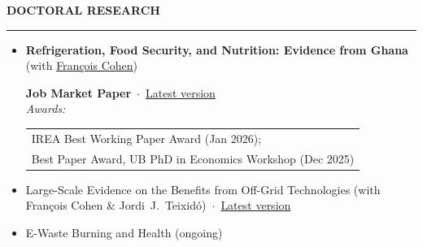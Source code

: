 \documentclass{resume} %
\def\sectionskip{\vspace{4pt}}
\def\sectionlineskip{\smallskip}
\renewenvironment{rSection}[1]{%
  \sectionskip
  \MakeUppercase{{\bf #1}}%
  \sectionlineskip
  \hrule
  \begin{list}{}{\setlength{\leftmargin}{0em}\setlength{\topsep}{5pt}\setlength{\itemsep}{0pt}\setlength{\parsep}{0pt}}%
  \item[]
}{%
  \end{list}
}
\begin{document}
\begin{rSection}{Doctoral Research}
\raggedright
\begin{itemize}
\item \textbf{Refrigeration, Food Security, and Nutrition: Evidence from Ghana} (with \href{https://sites.google.com/site/francoiscoheneconomist/home}{François Cohen})\\
{\small \textbf{Job Market Paper} \,$\cdot$\, \href{https://ntsifulenoch.github.io/files/Ntsiful_JMP.pdf}{Latest version}\\
\textit{Awards:} \begin{tabular}[t]{@{}l@{}}IREA Best Working Paper Award (Jan 2026);\\ Best Paper Award, UB PhD in Economics Workshop (Dec 2025)\end{tabular}}
\item Large-Scale Evidence on the Benefits from Off-Grid Technologies (with François Cohen \& Jordi~J.~Teixidó) \,$\cdot$\, {\small \href{https://ntsifulenoch.github.io/files/Ntsiful_Offgrid.pdf}{Latest version}}
\item E-Waste Burning and Health (ongoing)
\end{itemize}
\end{rSection}
\end{document}

